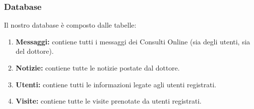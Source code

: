 \subsubsection{Database}
Il nostro database è composto dalle tabelle:
\begin{enumerate}
\item \textbf{Messaggi:} contiene tutti i messaggi dei Consulti Online (sia degli utenti, sia del dottore).
\item \textbf{Notizie:} contiene tutte le notizie postate dal dottore.
\item \textbf{Utenti:} contiene tutti le informazioni legate agli utenti registrati.
\item \textbf{Visite:} contiene tutte le visite prenotate da utenti registrati.
\end{enumerate}

